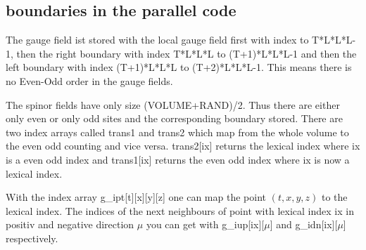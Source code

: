 \subsection{boundaries in the parallel code}

The gauge field ist stored with the local gauge field first with index
{ to T*L*L*L-1}, then the right boundary with index
{\ttfamily T*L*L*L to (T+1)*L*L*L-1} and then the left boundary with index
{\ttfamily (T+1)*L*L*L to (T+2)*L*L*L-1}. This means there is no
Even-Odd order in the gauge fields. 

The spinor fields have only size {\ttfamily (VOLUME+RAND)/2}. Thus
there are either only even or only odd sites and the corresponding
boundary stored. There are two index arrays called {\ttfamily trans1}
and {\ttfamily trans2} which map from the whole volume to the even odd
counting and vice versa. {\ttfamily trans2[ix]} returns the lexical
index where {\ttfamily ix} is a even odd index and
{\ttfamily trans1[ix]} returns the even odd index where {\ttfamily ix}
is now a lexical index. 

With the index array {\ttfamily g\_ipt[t][x][y][z]} one can map the
point $(t,x,y,z)$ to the lexical index. The indices of the next
neighbours of point with lexical index {\ttfamily ix} in positiv and
negative direction $\mu$ you can get with
{\ttfamily g\_iup[ix][$\mu$]} and {\ttfamily g\_idn[ix][$\mu$]}
respectively.


